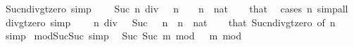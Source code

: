 \begin{isabellebody}
\ Suc{\isacharunderscore}{\kern0pt}n{\isacharunderscore}{\kern0pt}div{\isacharunderscore}{\kern0pt}{}{\isacharunderscore}{\kern0pt}gt{\isacharunderscore}{\kern0pt}zero\ {\isacharbrackleft}{\kern0pt}simp{\isacharbrackright}{\kern0pt}{\isacharcolon}{\kern0pt}\isanewline
\ \ {\isachardoublequoteopen}{}\ {\isacharless}{\kern0pt}\ Suc\ n\ div\ {}{\isachardoublequoteclose}\ \ {\isachardoublequoteopen}n\ {\isachargreater}{\kern0pt}\ {}{\isachardoublequoteclose}\ \ n\ {\isacharcolon}{\kern0pt}{\isacharcolon}{\kern0pt}\ nat\isanewline
%
\isadelimproof
\ \ %
\endisadelimproof
%
\isatagproof
{}\isamarkupfalse%
\ that\ \isamarkupfalse%
\ {\isacharparenleft}{\kern0pt}cases\ n{\isacharparenright}{\kern0pt}\ simp{\isacharunderscore}{\kern0pt}all%
\endisatagproof
{\isafoldproof}%
%
\isadelimproof
\isanewline
%
\endisadelimproof
\isanewline
{}\isamarkupfalse%
\ div{\isacharunderscore}{\kern0pt}{}{\isacharunderscore}{\kern0pt}gt{\isacharunderscore}{\kern0pt}zero\ {\isacharbrackleft}{\kern0pt}simp{\isacharbrackright}{\kern0pt}{\isacharcolon}{\kern0pt}\isanewline
\ \ {\isachardoublequoteopen}{}\ {\isacharless}{\kern0pt}\ n\ div\ {}{\isachardoublequoteclose}\ \ {\isachardoublequoteopen}Suc\ {}\ {\isacharless}{\kern0pt}\ n{\isachardoublequoteclose}\ \ n\ {\isacharcolon}{\kern0pt}{\isacharcolon}{\kern0pt}\ nat\isanewline
%
\isadelimproof
\ \ %
\endisadelimproof
%
\isatagproof
{}\isamarkupfalse%
\ that\ Suc{\isacharunderscore}{\kern0pt}n{\isacharunderscore}{\kern0pt}div{\isacharunderscore}{\kern0pt}{}{\isacharunderscore}{\kern0pt}gt{\isacharunderscore}{\kern0pt}zero\ {\isacharbrackleft}{\kern0pt}of\ {\isachardoublequoteopen}n\ {\isacharminus}{\kern0pt}\ {}{\isachardoublequoteclose}{\isacharbrackright}{\kern0pt}\ \isamarkupfalse%
\ simp%
\endisatagproof
{\isafoldproof}%
%
\isadelimproof
\isanewline
%
\endisadelimproof
\isanewline
{}\isamarkupfalse%
\ mod{}{\isacharunderscore}{\kern0pt}Suc{\isacharunderscore}{\kern0pt}Suc\ {\isacharbrackleft}{\kern0pt}simp{\isacharbrackright}{\kern0pt}{\isacharcolon}{\kern0pt}\isanewline
\ \ {\isachardoublequoteopen}Suc\ {\isacharparenleft}{\kern0pt}Suc\ m{\isacharparenright}{\kern0pt}\ mod\ {}\ {\isacharequal}{\kern0pt}\ m\ mod\ {}{\isachardoublequoteclose}\isanewline
%
\isadelimproof
\ \ %
\endisadelimproof
%
\isatagproof
{}\isamarkupfalse%

\end{isabellebody}
